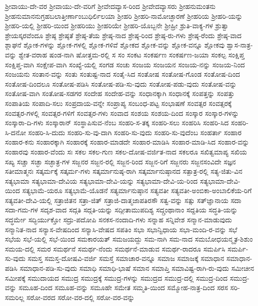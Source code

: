 {ಶ್ರೀವಾಯು-ದೇ-ವರ
ಶ್ರೀವಾಯು-ದೇ-ವರಿಗೆ
ಶ್ರೀವೇದವ್ಯಾಸ-ರಿಂದ
ಶ್ರೀವೇದವ್ಯಾಸರು
ಶ್ರೀಹನುಮಂತನು
ಶ್ರೀಹನುಮಾನನುಗ್ರಹಬಲಾತ್ತೀರ್ಣಾಂಬುಧಿರ್ಲಿಲಯಾ
ಶ್ರೀಹರಿ
ಶ್ರೀಹರಿ-ನಾಮೋಚ್ಛಾರಣೆ
ಶ್ರೀಹರಿಯ
ಶ್ರೀಹರಿ-ಯನ್ನು
ಶ್ರೀಹರಿ-ಯಲ್ಲಿ
ಶ್ರೀಹರಿ-ಯಿಂದ
ಶ್ರೀಹರಿಯು
ಶ್ರೀಹರಿಯೇ
ಶ್ರೀಹರಿ-ಯೊಬ್ಬನೇ
ಶ್ರೀಹ್ರೀ
ಶ್ರುತಿ-ವಾಕ್ಯ-ಗಳ
ಶ್ರುತ್ವಾ
ಶ್ರೇಯಸ್ಕರವೆಂದೂ
ಶ್ರೇಷ್ಠ
ಶ್ರೇಷ್ಠತೆ
ಶ್ರೇಷ್ಠ-ತೆಯ
ಶ್ರೇಷ್ಠ-ನಾದ
ಶ್ರೇಷ್ಠ-ರಿಂದ
ಶ್ರೇಷ್ಠ-ರು-ಗಳು
ಶ್ರೇಷ್ಠ-ರೆಂದು
ಶ್ರೇಷ್ಠ-ವಾದ
ಶ್ಲಾಘನೆ
ಶ್ಲೋಕ-ಗಳನ್ನು
ಶ್ಲೋಕ-ಗಳಲ್ಲಿ
ಶ್ಲೋಕ-ಗಳಿವೆ
ಶ್ಲೋಕದ
ಶ್ಲೋಕ-ವನ್ನು
ಶ್ಲೋಕ-ವನ್ನೂ
ಶ್ಲೋಕವು
ಶ್ವಾಸ-ನಾತ್ರ-ವನ್ನು
ಶ್ವೇತ-ವರಾಹ
ಷಂಡ-ನಾಗಿ
ಷೋತ್ತಮ-ರಲ್ಲಿ
ಸ
ಸಂ
ಸಂಕಟ
ಸಂಕರ್ಷಣ
ಸಂಕರ್ಷಣ-ಜಯಾ
ಸಂಕಲ್ಪ
ಸಂಕ್ಷಿಪ್ತ
ಸಂಕ್ಷಿಪ್ತ-ವಾಗಿ
ಸಂಕ್ಷೇಪ-ವಾಗಿ
ಸಂಖ್ಯೆ-ಯಲ್ಲಿ
ಸಂಗಡ
ಸಂಚು
ಸಂಜಯ
ಸಂಜಯನ
ಸಂಜಯ-ನನ್ನು
ಸಂಜಯ-ನಿಂದ
ಸಂಜಯನು
ಸಂತಾನ-ವನ್ನು
ಸಂತು
ಸಂತುಷ್ಟ-ನಾದ
ಸಂತೈ-ಸಿದ
ಸಂತೋಷ
ಸಂತೋಷ-ಗೊಂಡ
ಸಂತೋಷ-ದಿಂದ
ಸಂತೋಷ-ದಿಂದಲೂ
ಸಂತೋಷ-ಪಡಿಸಿ
ಸಂತೋಷ-ಪಡಿ-ಸು-ವುದು
ಸಂತೋಷ-ಪಡು-ವುದು
ಸಂತೋಷ-ವನ್ನು
ಸಂತೋಷ-ವಾಗಿ
ಸಂತೋಷ-ಸಡಗರ
ಸಂದೇಹ
ಸಂದೇಹ-ವನ್ನು
ಸಂಧಾನಕ್ಕಾಗಿ
ಸಂಧಾನಕ್ಕೆ
ಸಂಪತ್ತನ್ನು
ಸಂಪತ್ತು
ಸಂಪಾತಿಯ
ಸಂಪಾದಿ-ಸಲು
ಸಂಪ್ರದಾಯ-ವನ್ನೇ
ಸಂಪ್ರಾಪ್ಯ
ಸಂಬಂಧ-ಪಟ್ಟ
ಸಂಭಾಷಣೆ
ಸಂವತ್ಸರ
ಸಂವತ್ಸರಕ್ಕೆ
ಸಂವತ್ಸರ-ಗಳಲ್ಲಿ
ಸಂವತ್ಸರ-ಗಳಿಗೆ
ಸಂವತ್ಸರ-ಗಳು
ಸಂವಾದ
ಸಂಶಯ
ಸಂಶಯ-ದಿಂದ
ಸಂಸ್ಕಾರ
ಸಂಸ್ಕಾರ-ಗಳನ್ನು
ಸಂಸ್ಕಾರಾ-ದಿ-ಗಳು
ಸಂಸ್ಕಾರಾನ್
ಸಂಸ್ಥಾಪಿಸುವ-ನೆಂಬ
ಸಂಹರಿ-ಸ-ತಕ್ಕ
ಸಂಹರಿ-ಸಲು
ಸಂಹರಿಸಿ
ಸಂಹರಿ-ಸಿದ
ಸಂಹರಿ-ಸಿ-ದನೋ
ಸಂಹರಿ-ಸಿ-ದುದು
ಸಂಹರಿ-ಸು-ವು-ದಾಗಿ
ಸಂಹರಿ-ಸು-ವುದು
ಸಂಹರಿ-ಸು-ವುದೆಂಬ
ಸಂಹರ್ತಾ
ಸಂಹಾರ
ಸಂಹಾರ-ಕನು
ಸಂಹಾರಕ್ಕಾಗಿ
ಸಂಹಾರಕ್ಕೆ
ಸಂಹಾರ-ಮಾಡದೇ
ಸಂಹಾರ-ಮಾಡಿಸಿ
ಸಂಹಾರ-ಮಾಡಿ-ಸಿದ
ಸಂಹಾರ-ವನ್ನು
ಸಂಹಾರವು
ಸಂಹಾರ-ವೆಂದು
ಸಃ
ಸಕಲ
ಸಕಲ-ಗುಣ
ಸಕಲ-ದೋಷ-ವರ್ಜಿತ-ನಾದ
ಸಕಲರೂ
ಸಖಿತ್ವಮಾಪ್ಯ
ಸಖಿಯ
ಸಖ್ಯ
ಸಚ್ಚಾ
ಸಚ್ಛಾ
ಸಚ್ಛಾತ್ರ-ಗಳ
ಸಜ್ಜನರ
ಸಜ್ಜನ-ರಲ್ಲಿ
ಸಜ್ಜನ-ರಿಂದ
ಸಜ್ಜನ-ರಿಗೆ
ಸಜ್ಜನರು
ಸಜ್ಜನಸಂವಿದೇ
ಸಜ್ಞನ
ಸತೀಮಾತ್ಮನಃ
ಸತ್ಕರ್ಮಕ್ಕೆ
ಸತ್ಕರ್ಮ-ಗಳು
ಸತ್ಕರ್ಮಾನುಷ್ಠ-ರಾಗಿ
ಸತ್ಕರ್ಮಾನುಷ್ಠಾನದ
ಸತ್ಪಾತ್ರ-ರಲ್ಲಿ
ಸತ್ಯ-ಜಿತು-ವಿನ
ಸತ್ಯಭಾಮಾ
ಸತ್ಯಭಾಮಾ-ದೇವಿಯ
ಸತ್ಯಭಾಮಾ-ದೇವಿ-ಯನ್ನು
ಸತ್ಯಭಾಮಾ-ದೇವಿ-ಯ-ರಿಂದ
ಸತ್ಯಭಾಮಾ-ದೇವಿ-ಯಿಂದ
ಸತ್ಯಭಾಮೆ-ಯರೂ
ಸತ್ಯಭಾಮೆ-ಯೊಡನೆ
ಸತ್ಯರ್ಮಾನುಷ್ಠಾನ
ಸತ್ಯವತೀ
ಸತ್ಯವತೀ-ಅಂಬಿಕಾ-ಅಂಬಾಲಿಕೆಯ-ರಿಗೆ
ಸತ್ಯವತೀ-ದೇವಿ-ಯಲ್ಲಿ
ಸತ್ರಾಜಿತನ
ಸತ್ರಾ-ಜಿತ್
ಸತ್ರಾಜಿ-ದಾತ್ಮಜಾಪತಿರಸೌ
ಸತ್ವ-ವನ್ನು
ಸತ್ಸು
ಸತ್‌ಜ್ಞಾನಾಯ
ಸದಾ
ಸದಾ-ಗಮ-ಗಳ
ಸದೃಶ-ವಾದ
ಸದ್ಗತಿ
ಸದ್ಗತಿ-ಯನ್ನು
ಸದ್ಗೀತಾಮುಪದಿಶ್ಯ
ಸದ್ಗ್ರಂಥಾನಾಂ
ಸದ್ದತಿಯ
ಸದ್ಧತಿ-ಯನ್ನು
ಸದ್ಧರ್ಮೇ
ಸದ್ಭಿರ್ಯುಕ್ತೋ
ಸದ್ರು-ಪದೋಪಿ
ಸನಕಸ-ನಂದಾದಿ-ಗಳು
ಸನ್ನಾಹ
ಸನ್ನಿವೇಶ
ಸನ್ಮಾನ-ಮಾಡುವುದು
ಸನ್ಮಾನಿತ-ನಾದ
ಸನ್ಯಾಸ-ವೇಷದಿಂದ
ಸನ್ಯಾಸಿ-ವೇಷದ
ಸಪತಿಂ
ಸಭಾ
ಸಭಾನ್ವಿಧಾಯ
ಸಭಾ-ಮಂದಿ-ರ-ವನ್ನು
ಸಭೆ
ಸಭೆಯ
ಸಭೆ-ಯಲ್ಲಿ
ಸಭೆ-ಯಿಂದ
ಸಮಕಾರಯತ್‌
ಸಮಜಯದ್ದು
ಸಮ-ನಾಗಿ
ಸಮ-ನಾದ
ಸಮಬೋಧಯನ್ಮೃತ-ಶಿಶುಂ
ಸಮಯ-ದಲ್ಲಿ
ಸಮರ
ಸಮರ್ಥನೆ
ಸಮರ್ಥ-ನೆಂದು
ಸಮರ್ಥನೆ-ಮಾಡುವ
ಸಮರ್ಥ-ರಾದರೂ
ಸಮರ್ಪಿಸಿ
ಸಮರ್ಪಿ-ಸು-ವುದು
ಸಮಸ್ತ
ಸಮಸ್ತ-ದೋಷವಿ-ವರ್ಜಿ
ಸಮಸ್ತೆ
ಸಮಾಚಾರ-ವನ್ನೂ
ಸಮಾಜ
ಸಮಾಜಕ್ಕೆ
ಸಮಾಧಾನ
ಸಮಾಧಾನ-ಪಡಿಸಿ
ಸಮಾಧಾನ-ಪಡಿ-ಸು-ವುದು
ಸಮಾಧಿ
ಸಮಾಧಿ-ಭಾಷೆ
ಸಮಾನ
ಸಮಾಪ್ತಿ
ಸಮಾವಿಷ್ಟ-ರಾಗಿ-ರು-ವುದು
ಸಮೀಚೀನ
ಸಮೀಪಕ್ಕೆ
ಸಮುದಾಯದ
ಸಮುದ್ರ
ಸಮುದ್ರಕ್ಕೆ
ಸಮುದ್ರ-ಗಳನ್ನು
ಸಮುದ್ರದ
ಸಮುದ್ರ-ದಲ್ಲಿ
ಸಮುದ್ರ-ದಿಂದ
ಸಮುದ್ರ-ವನ್ನು
ಸಮೂಹ-ದಿಂದ
ಸಮೂಹ-ವನ್ನು
ಸಮೂಹೇ
ಸಮೇತ
ಸಮ್ಮತಿ-ಯಿಂದ
ಸಮ್ಮೋಹ-ನಾತ್ರ-ದಿಂದ
ಸರಸ
ಸರಿ-ಸಮರಿಲ್ಲ
ಸರೋ-ವರದ
ಸರೋ-ವರ-ದಲ್ಲಿ
ಸರೋ-ವರ-ವನ್ನು
}
